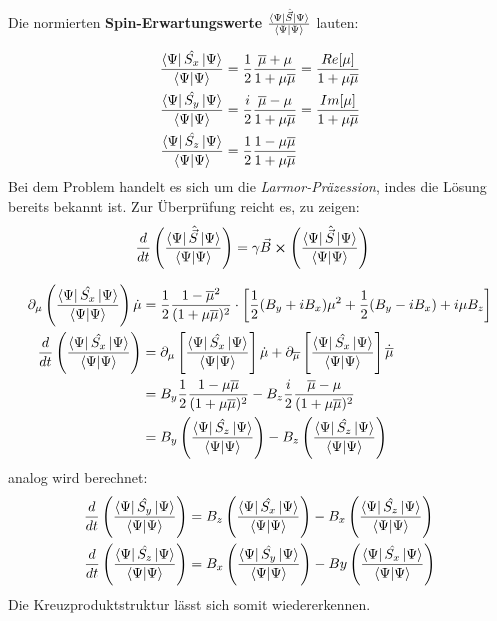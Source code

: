 Die normierten \textbf{Spin-Erwartungswerte} $\frac{\bra{\Psi}\hat{\vec{S}}\ket{\Psi}}{\bra{\Psi}\ket{\Psi}}$ lauten:

\begin{align}
    \frac{\bra{\Psi}\hat{S_x}\ket{\Psi}}{\bra{\Psi}\ket{\Psi}} &= \frac{1}{2}\frac{\overline{\mu} + \mu}{1+\mu\overline{\mu}} = \frac{Re[\mu]}{1 + \mu\overline{\mu}} \\
    \frac{\bra{\Psi}\hat{S_y}\ket{\Psi}}{\bra{\Psi}\ket{\Psi}} &= \frac{i}{2}\frac{\overline{\mu} - \mu}{1+\mu\overline{\mu}} = \frac{Im[\mu]}{1 + \mu\overline{\mu}} \\
    \frac{\bra{\Psi}\hat{S_z}\ket{\Psi}}{\bra{\Psi}\ket{\Psi}} &= \frac{1}{2}\frac{1 - \mu\overline{\mu}}{1 + \mu\overline{\mu}}  
\end{align}
Bei dem Problem handelt es sich um die \textit{Larmor-Präzession}, indes die Lösung bereits bekannt ist. Zur Überprüfung reicht es,
 zu zeigen:
\begin{align}
    \frac{d}{dt}\left(\frac{\bra{\Psi}\hat{\vec{S}}\ket{\Psi}}{\bra{\Psi}\ket{\Psi}}\right) &= \gamma\vec{B} \cross \left(\frac{\bra{\Psi}\hat{\vec{S}}\ket{\Psi}}{\bra{\Psi}\ket{\Psi}}\right)
\end{align}


\begin{align}
    \partial_\mu \left(\frac{\bra{\Psi}\hat{S_x}\ket{\Psi}}{\bra{\Psi}\ket{\Psi}}\right)\dot{\mu} &= \frac{1}{2}\frac{1-\overline{\mu}^2}{(1+\mu\overline{\mu})^2}\cdot\left[\frac{1}{2}(B_y + iB_x)\mu^2 + \frac{1}{2}(B_y - iB_x) +i\mu B_z\right]  \\
    \frac{d}{dt}\left(\frac{\bra{\Psi}\hat{S_x}\ket{\Psi}}{\bra{\Psi}\ket{\Psi}}\right) &= \partial_{\mu}\left[\frac{\bra{\Psi}\hat{S_x}\ket{\Psi}}{\bra{\Psi}\ket{\Psi}}\right]\dot{\mu} + \partial_{\overline{\mu}}\left[\frac{\bra{\Psi}\hat{S_x}\ket{\Psi}}{\bra{\Psi}\ket{\Psi}}\right]\dot{\overline{\mu}}\\
    &= B_y \frac{1}{2}\frac{1-\mu\overline{\mu}}{(1+\mu\overline{\mu})^2} - B_z \frac{i}{2}\frac{\overline{\mu} -\mu}{(1+\mu\overline{\mu})^2}    \\
    &= B_y\left(\frac{\bra{\Psi}\hat{S_z}\ket{\Psi}}{\bra{\Psi}\ket{\Psi}}\right) - B_z\left(\frac{\bra{\Psi}\hat{S_z}\ket{\Psi}}{\bra{\Psi}\ket{\Psi}}\right)
\end{align}
analog wird berechnet:
\begin{align}
    \frac{d}{dt}\left(\frac{\bra{\Psi}\hat{S_y}\ket{\Psi}}{\bra{\Psi}\ket{\Psi}}\right) &= B_z\left(\frac{\bra{\Psi}\hat{S_x}\ket{\Psi}}{\bra{\Psi}\ket{\Psi}}\right) - B_x\left(\frac{\bra{\Psi}\hat{S_z}\ket{\Psi}}{\bra{\Psi}\ket{\Psi}}\right)\\
    \frac{d}{dt}\left(\frac{\bra{\Psi}\hat{S_z}\ket{\Psi}}{\bra{\Psi}\ket{\Psi}}\right) &= B_x\left(\frac{\bra{\Psi}\hat{S_y}\ket{\Psi}}{\bra{\Psi}\ket{\Psi}}\right) - By\left(\frac{\bra{\Psi}\hat{S_x}\ket{\Psi}}{\bra{\Psi}\ket{\Psi}}\right)
\end{align}
Die Kreuzproduktstruktur lässt sich somit wiedererkennen.

